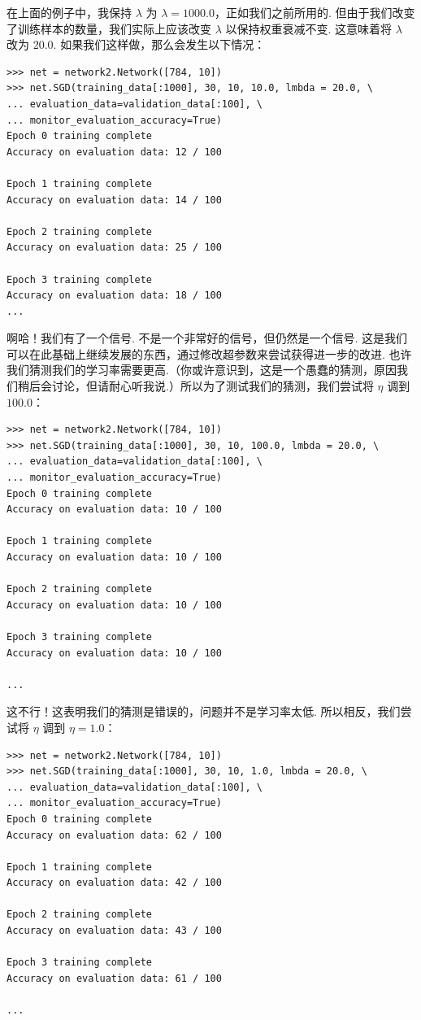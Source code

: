 在上面的例子中，我保持 $\lambda$ 为 $\lambda = 1000.0$，正如我们之前所用的. 但由于我们改变了训练样本的数量，我们实际上应该改变 $\lambda$ 以保持权重衰减不变. 这意味着将 $\lambda$ 改为 $20.0$. 如果我们这样做，那么会发生以下情况：

\begin{lstlisting}
>>> net = network2.Network([784, 10])
>>> net.SGD(training_data[:1000], 30, 10, 10.0, lmbda = 20.0, \
... evaluation_data=validation_data[:100], \
... monitor_evaluation_accuracy=True)
Epoch 0 training complete
Accuracy on evaluation data: 12 / 100

Epoch 1 training complete
Accuracy on evaluation data: 14 / 100

Epoch 2 training complete
Accuracy on evaluation data: 25 / 100

Epoch 3 training complete
Accuracy on evaluation data: 18 / 100
...

\end{lstlisting}

啊哈！我们有了一个信号. 不是一个非常好的信号，但仍然是一个信号. 这是我们可以在此基础上继续发展的东西，通过修改超参数来尝试获得进一步的改进. 也许我们猜测我们的学习率需要更高.（你或许意识到，这是一个愚蠢的猜测，原因我们稍后会讨论，但请耐心听我说.）所以为了测试我们的猜测，我们尝试将 $\eta$ 调到 $100.0$：

\begin{lstlisting}
>>> net = network2.Network([784, 10])
>>> net.SGD(training_data[:1000], 30, 10, 100.0, lmbda = 20.0, \
... evaluation_data=validation_data[:100], \
... monitor_evaluation_accuracy=True)
Epoch 0 training complete
Accuracy on evaluation data: 10 / 100

Epoch 1 training complete
Accuracy on evaluation data: 10 / 100

Epoch 2 training complete
Accuracy on evaluation data: 10 / 100

Epoch 3 training complete
Accuracy on evaluation data: 10 / 100

...

\end{lstlisting}

这不行！这表明我们的猜测是错误的，问题并不是学习率太低. 所以相反，我们尝试将 $\eta$ 调到 $\eta = 1.0$：

\begin{lstlisting}
>>> net = network2.Network([784, 10])
>>> net.SGD(training_data[:1000], 30, 10, 1.0, lmbda = 20.0, \
... evaluation_data=validation_data[:100], \
... monitor_evaluation_accuracy=True)
Epoch 0 training complete
Accuracy on evaluation data: 62 / 100

Epoch 1 training complete
Accuracy on evaluation data: 42 / 100

Epoch 2 training complete
Accuracy on evaluation data: 43 / 100

Epoch 3 training complete
Accuracy on evaluation data: 61 / 100

...

\end{lstlisting}

